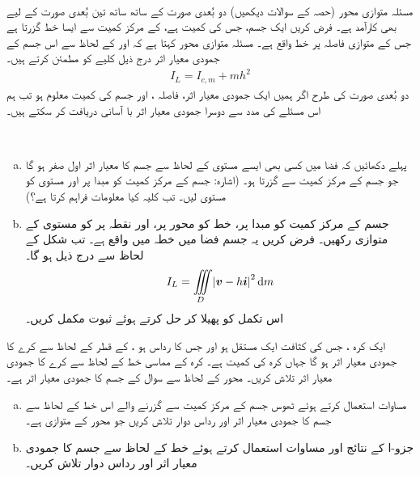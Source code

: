 \\
مسئلہ متوازی محور (حصہ  کے سوالات دیکھیں)   دو بُعدی صورت  کے ساتھ ساتھ تین بُعدی صورت  کے لیے بھی کارآمد ہے۔ فرض کریں ایک جسم،  جس کی کمیت  ہے،  کے مرکز کمیت سے  ایسا خط  گزرتا ہے جس کے متوازی   فاصلہ پر خط  واقع  ہے۔ مسئلہ متوازی محور کہتا ہے کہ  اور  کے لحاظ سے اس جسم کے جمودی معیار اثر درج ذیل کلیے  کو مطمئن کرتے ہیں۔
\begin{align}\label{مساوات_بالکثرت_مسئلہ_متوازی_محور_الف}
I_L=I_{c,m}+mh^2
\end{align}
دو بُعدی  صورت کی طرح اگر ہمیں ایک جمودی معیار اثر، فاصلہ  ، اور جسم کی کمیت  معلوم ہو تب   ہم اس  مسئلے کی  مدد سے  دوسرا جمودی معیار اثر با آسانی  دریافت کر سکتے ہیں۔


\\
\begin{enumerate}[a.]
\item
پہلے دکھائیں کہ فضا میں کسی بھی  ایسے مستوی کے لحاظ سے جسم کا   معیار اثر اول صفر ہو گا جو   جسم کے مرکز کمیت سے گزرتا ہو۔ (اشارہ: جسم کے مرکز کمیت کو مبدا پر اور مستوی کو مستوی  لیں۔ تب کلیہ  کیا معلومات فراہم کرتا ہے؟)
\item
جسم کے مرکز کمیت کو  مبدا پر،  خط  کو محور  پر، اور نقطہ  پر   کو مستوی  کے  متوازی رکھیں۔ فرض کریں یہ    جسم  فضا میں خطہ  میں واقع ہے۔ تب شکل کے لحاظ سے  درج ذیل ہو گا۔
\begin{align}\label{مساوات_بالکثرت_مسئلہ_متوازی_محور_ب}
I_L=\iiint\limits_D \abs{\kvec{v}-h\ai}^2\dif m
\end{align}
اس تکمل کو   پھیلا   کر حل  کرتے  ہوئے ثبوت مکمل کریں۔
\end{enumerate}
ایک کرہ ، جس کی کثافت ایک     مستقل ہو اور   جس کا رداس  ہو ، کے قطر کے لحاظ سے   کرے  کا جمودی معیار اثر  ہو گا جہاں کرہ کی کمیت  ہے۔ کرہ کے مماسی خط کے لحاظ سے کرے کا جمودی معیار اثر تلاش کریں۔ 
محور  کے لحاظ سے سوال  کے جسم کا جمودی معیار اثر  ہے۔
\begin{enumerate}[a.]
\item
مساوات  استعمال کرتے ہوئے  ٹھوس جسم کے مرکز کمیت سے گزرنے والے اس  خط کے لحاظ سے جسم  کا جمودی معیار اثر اور رداس دوار تلاش کریں جو  محور  کے متوازی   ہے۔
\item
جزو-ا کے نتائج اور مساوات  استعمال کرتے ہوئے  خط  کے لحاظ سے  جسم کا جمودی معیار اثر اور رداس دوار تلاش کریں۔
\end{enumerate}

